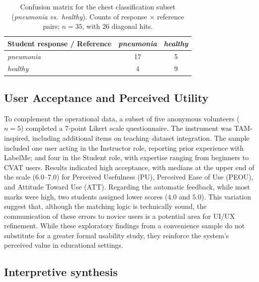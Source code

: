 \documentclass[runningheads]{llncs}
\begin{document}
\begin{table}[H]
  \centering
  \caption{Confusion matrix for the chest classification subset (\emph{pneumonia} \emph{vs.}\ \emph{healthy}). Counts of response $\times$ reference pairs; $n=35$, with $26$ diagonal hits.}
  \label{tab:confusao-pulmao}
  \begin{tabular}{lcc}
    \toprule
    Student response / Reference & \emph{pneumonia} & \emph{healthy} \\
    \midrule
    \emph{pneumonia} & 17 & 5 \\
    \emph{healthy}  & 4  & 9 \\
    \bottomrule
  \end{tabular}
\end{table}

\subsection{User Acceptance and Perceived Utility}
To complement the operational data, a subset of five anonymous volunteers ($n=5$) completed a 7-point Likert scale questionnaire. The instrument was TAM-inspired, including additional items on teaching–dataset integration. The sample included one user acting in the Instructor role, reporting prior experience with LabelMe; and four in the Student role, with expertise ranging from beginners to CVAT users. Results indicated high acceptance, with medians at the upper end of the scale ($6.0$--$7.0$) for Perceived Usefulness (PU), Perceived Ease of Use (PEOU), and Attitude Toward Use (ATT). Regarding the automatic feedback, while most marks were high, two students assigned lower scores ($4.0$ and $5.0$). This variation suggest that, although the matching logic is technically sound, the communication of these errors to novice users is a potential area for UI/UX refinement. While these exploratory findings from a convenience sample do not substitute for a greater formal usability study, they reinforce the system's perceived value in educational settings.

\subsection{Interpretive synthesis}
\end{document}
